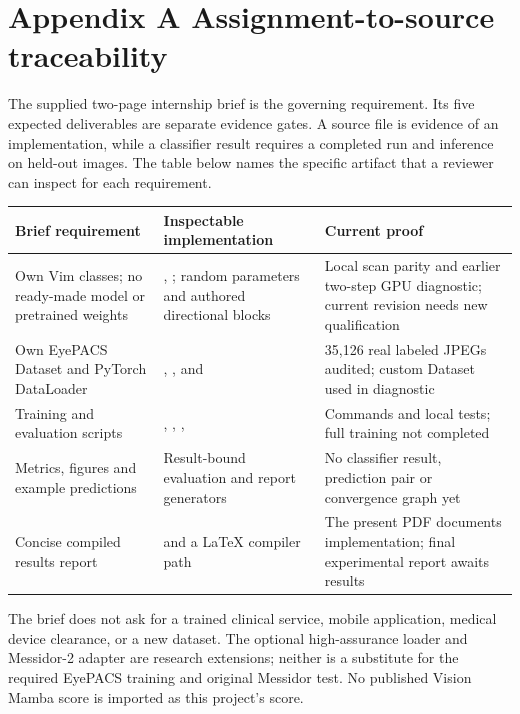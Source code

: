 \newpage
\section*{\color{ink}Appendix A \quad Assignment-to-source traceability}
The supplied two-page internship brief is the governing requirement. Its
five expected deliverables are separate evidence gates. A source file is
evidence of an implementation, while a classifier result requires a
completed run and inference on held-out images. The table below names the
specific artifact that a reviewer can inspect for each requirement.

\small
\begin{tabularx}{\linewidth}{@{}p{.27\linewidth}Y p{.22\linewidth}@{}}
\toprule
Brief requirement & Inspectable implementation & Current proof\\
\midrule
Own Vim classes; no ready-made model or pretrained weights &
, ; random parameters and
authored directional blocks & Local scan parity and earlier two-step GPU
diagnostic; current revision needs new qualification\\
Own EyePACS Dataset and PyTorch DataLoader &
, , 
and  & 35,126 real labeled JPEGs audited; custom
Dataset used in diagnostic\\
Training and evaluation scripts &
, , ,  &
Commands and local tests; full training not completed\\
Metrics, figures and example predictions &
Result-bound evaluation and report generators & No classifier result,
prediction pair or convergence graph yet\\
Concise compiled results report &
 and a LaTeX compiler path & The present PDF documents
implementation; final experimental report awaits results\\
\bottomrule
\end{tabularx}
\normalsize

The brief does not ask for a trained clinical service, mobile application,
medical device clearance, or a new dataset. The optional high-assurance
loader and Messidor-2 adapter are research extensions; neither is a
substitute for the required EyePACS training and original Messidor test.
No published Vision Mamba score is imported as this project's score.

